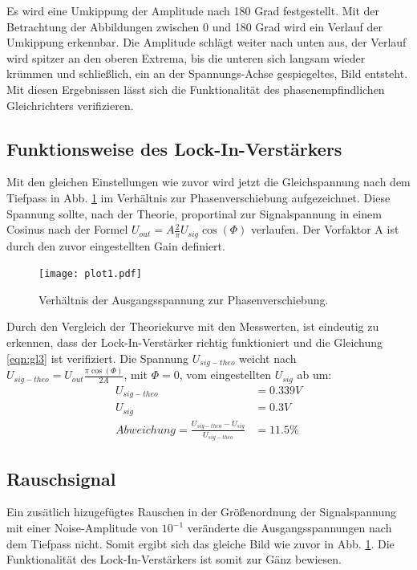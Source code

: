 Es wird eine Umkippung der Amplitude nach 180 Grad festgestellt.
Mit der Betrachtung der Abbildungen zwischen 0 und 180 Grad wird ein Verlauf der Umkippung erkennbar.
Die Amplitude schlägt weiter nach unten aus, der Verlauf wird spitzer an den oberen Extrema, bis die unteren sich langsam wieder krümmen und schließlich, ein an der Spannungs-Achse gespiegeltes, Bild entsteht.
Mit diesen Ergebnissen lässt sich die Funktionalität des phasenempfindlichen Gleichrichters verifizieren.

\subsection{Funktionsweise des Lock-In-Verstärkers}
\label{Funktionsweise}

Mit den gleichen Einstellungen wie zuvor wird jetzt die Gleichspannung nach dem Tiefpass in Abb. \ref{fig:plot1} im Verhältnis zur Phasenverschiebung aufgezeichnet.
Diese Spannung sollte, nach der Theorie, proportinal zur Signalspannung in einem Cosinus nach der Formel $U_{out} = A \frac{2}{\pi}U_{sig}\cos(\Phi)$ verlaufen.
Der Vorfaktor A ist durch den zuvor eingestellten Gain definiert.

\begin{figure}
  \centering
  \texttt{[image: plot1.pdf]}
  \caption{Verhältnis der Ausgangsspannung zur Phasenverschiebung.}
  \label{fig:plot1}
\end{figure}

Durch den Vergleich der Theoriekurve mit den Messwerten, ist eindeutig zu erkennen, dass der Lock-In-Verstärker richtig funktioniert und die Gleichung \eqref{eqn:gl3} ist verifiziert.
Die Spannung $U_{sig-theo}$ weicht nach $U_{sig-theo} = U_{out} \frac{\pi \cos(\Phi)}{2A}$, mit $\Phi = 0$, vom eingestellten $U_{sig}$ ab um:
\begin{align*}
  U_{sig-theo} &= 0.339 V \\
  U_{sig} &= 0.3 V \\
  Abweichung = \frac{U_{sig-theo} - U_{sig}}{U_{sig-theo}} &= 11.5 \%
\end{align*}


\subsection{Rauschsignal}
\label{sec:Rausch}

Ein zusätlich hizugefügtes Rauschen in der Größenordnung der Signalspannung mit einer Noise-Amplitude von $10^{-1}$ veränderte die Ausgangsspannungen nach dem Tiefpass nicht.
Somit ergibt sich das gleiche Bild wie zuvor in Abb. \ref{fig:plot1}.
Die Funktionalität des Lock-In-Verstärkers ist somit zur Gänz bewiesen.

